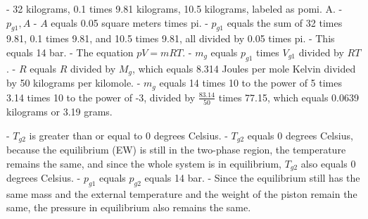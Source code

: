 - 32 kilograms, 0.1 times 9.81 kilograms, 10.5 kilograms, labeled as pomi. A.
- \( p_{g1}, A \)
- \( A \) equals 0.05 square meters times pi.
- \( p_{g1} \) equals the sum of 32 times 9.81, 0.1 times 9.81, and 10.5 times 9.81, all divided by 0.05 times pi.
- This equals 14 bar.
- The equation \( pV = mRT \).
- \( m_g \) equals \( p_{g1} \) times \( V_{g1} \) divided by \( RT \).
- \( R \) equals \( R \) divided by \( M_g \), which equals 8.314 Joules per mole Kelvin divided by 50 kilograms per kilomole.
- \( m_g \) equals 14 times 10 to the power of 5 times 3.14 times 10 to the power of -3, divided by \( \frac{83.14}{50} \) times 77.15, which equals 0.0639 kilograms or 3.19 grams.

- \( T_{g2} \) is greater than or equal to 0 degrees Celsius.
- \( T_{g2} \) equals 0 degrees Celsius, because the equilibrium (EW) is still in the two-phase region, the temperature remains the same, and since the whole system is in equilibrium, \( T_{g2} \) also equals 0 degrees Celsius.
- \( p_{g1} \) equals \( p_{g2} \) equals 14 bar.
- Since the equilibrium still has the same mass and the external temperature and the weight of the piston remain the same, the pressure in equilibrium also remains the same.